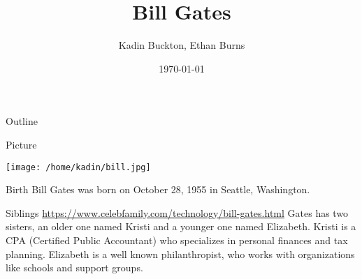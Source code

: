 \documentclass[presentation]{beamer}
\author{Kadin Buckton, Ethan Burns}
\date{\today}
\title{Bill Gates}
\begin{document}
\maketitle
\begin{frame}{Outline}
\tableofcontents
\end{frame}


\begin{frame}[label={sec:org9a2fe2d}]{Picture}
\begin{center}
\texttt{[image: /home/kadin/bill.jpg]}
\end{center}
\end{frame}

\begin{frame}[label={sec:org942236a}]{Birth}
Bill Gates was born on October 28, 1955 in Seattle, Washington.
\end{frame}

\begin{frame}[label={sec:orgcbdabbf}]{Siblings}
\url{https://www.celebfamily.com/technology/bill-gates.html}
Gates has two sisters, an older one named Kristi and a younger one named Elizabeth. Kristi is a CPA (Certified Public Accountant) who specializes in personal finances and tax planning. Elizabeth is a well known philanthropist, who works with organizations like schools and support groups.

\cite{government}
\end{frame}
\end{document}
